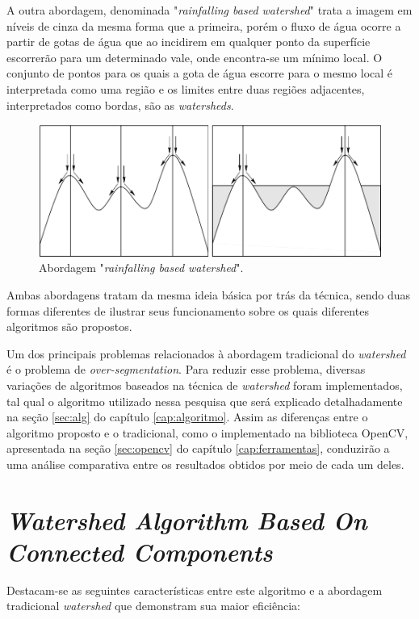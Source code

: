 A outra abordagem, denominada "\textit{rainfalling based watershed}" trata a imagem em níveis de cinza da mesma forma que a primeira, porém o fluxo de água ocorre a partir de gotas de água que ao incidirem em qualquer ponto da superfície escorrerão para um determinado vale, onde encontra-se um mínimo local. O conjunto de pontos para os quais a gota de água escorre para o mesmo local é interpretada como uma região e os limites entre duas regiões adjacentes,  interpretados como bordas, são as \textit{watersheds}.

	\begin{figure}[!htb]
       \begin{center}  
          \includegraphics[width=0.8\columnwidth]{img/abordagem_rainfalling.jpg}
           \caption{\label{fig:abordagem_rainfalling}Abordagem "\textit{rainfalling based watershed}".}
       \end{center}
   \end{figure} 
	

Ambas abordagens tratam da mesma ideia básica por trás da técnica, sendo duas formas diferentes de ilustrar seus funcionamento sobre os quais diferentes algoritmos são propostos.

Um dos principais problemas relacionados à abordagem tradicional do \textit{watershed} é o problema de \textit{over-segmentation}. Para reduzir esse problema, diversas variações de algoritmos baseados na técnica de \textit{watershed} foram implementados, tal qual o algoritmo utilizado nessa pesquisa que será explicado detalhadamente na seção \ref{sec:alg} do capítulo \ref{cap:algoritmo}. Assim as diferenças entre o algoritmo proposto e o tradicional, como o implementado na biblioteca OpenCV, apresentada na seção \ref{sec:opencv} do capítulo \ref{cap:ferramentas}, conduzirão a uma análise comparativa entre os resultados obtidos por meio de cada um deles.

\section{\textit{Watershed Algorithm Based On Connected Components}}
Destacam-se as seguintes características entre este algoritmo e a abordagem tradicional \textit{watershed} que demonstram sua maior eficiência:

